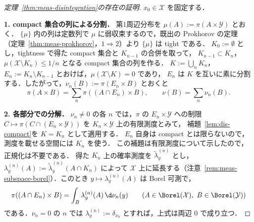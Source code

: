 \begin{proof}[定理~\ref{thm:meas-disintegration}の存在の証明]
  $x_0\in\mathcal{X}$ を固定する．

  \textbf{1. compact 集合の列による分割．}
  第1周辺分布を $\mu(A):=\pi(A\times\mathcal{Y})$ とおく．
  $\{\mu\}$ 内の列は定数列で $\mu$ に弱収束するので，既出の Prokhorov の定理
  （定理~\ref{thm:meas-prokhorov}，$1\Rightarrow2$）より $\{\mu\}$ は tight である．
  $K_0:=\emptyset$ とし，tightness で得た compact 集合と $K_{n-1}$ の合併を取って，
  $K_{n-1}\subset K_n$，$\mu(\mathcal{X}\setminus K_n)\leq1/n$ となる compact 集合の列を作る．
  $K:=\bigcup_nK_n$，$E_n:=K_n\setminus K_{n-1}$ とおけば，$\mu(\mathcal{X}\setminus K)=0$ であり，
  $E_n$ は $K$ を互いに素に分割する．したがって，$\nu_n(B):=\pi(E_n\times B)$ とおくと
  \[
    \pi(A\times B)=\sum_n\pi((A\cap E_n)\times B),\qquad
    \nu(B)=\sum_n\nu_n(B).
  \]

  \textbf{2. 各部分での分解．}
  $\nu_n\neq0$ の各 $n$ では，$\pi$ の $E_n\times\mathcal{Y}$ への制限
  $C\mapsto\pi(C\cap(E_n\times\mathcal{Y}))$ を $K_n\times\mathcal{Y}$ 上の有限測度とみて，
  補題~\ref{lem:dis-compact}を $K=K_n$ として適用する．
  $E_n$ 自身は compact とは限らないので，測度を載せる空間には $K_n$ を使う．
  この補題は有限測度について示したので，正規化は不要である．
  得た $K_n$ 上の確率測度を $\widetilde{\lambda}_y^{(n)}$ とし，
  $\lambda_y^{(n)}(A):=\widetilde{\lambda}_y^{(n)}(A\cap K_n)$ によって
  $\mathcal{X}$ 上に延長する（注意~\ref{rem:meas-subspace-borel}）．このとき
  $y\mapsto\lambda_y^{(n)}(A)$ は Borel 可測で，
  \[
    \pi((A\cap E_n)\times B)=\int_B\lambda_y^{(n)}(A)\,\d\nu_n(y)
    \qquad(A\in\Borel(\mathcal{X}),\ B\in\Borel(\mathcal{Y}))
  \]
  である．$\nu_n=0$ の $n$ では $\lambda_y^{(n)}:=\delta_{x_0}$ とすれば，上式は両辺 $0$ で成り立つ．


\end{proof}
